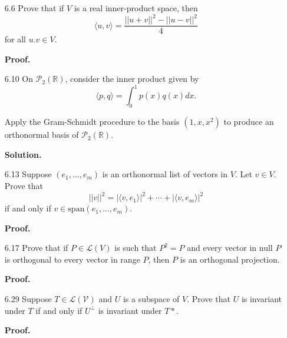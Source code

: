 \documentclass[9pt]{article}
\newcommand{\R}{\mathbb{R}}
\newcommand{\cyc}[1]{\langle #1 \rangle}
\begin{document}
\begin{enumerate}
   \item[6.6]  Prove that if $V$ is a real inner-product space, then
               $$\cyc{u, v} = \frac{||u + v||^2 - ||u - v||^2}{4}$$
               for all $u. v \in V$.

      \textbf{Proof.} 
   \item[6.10] On $\mathcal{P}_2(\R)$, consider the inner product given by
               $$\cyc{p, q} = \int_0^1p(x)q(x) dx.$$

               Apply the Gram-Schmidt procedure to the basis $(1, x, x^2)$ to
               produce an orthonormal basis of $\mathcal{P}_2(\R)$.

      \textbf{Solution.} 
   \item[6.13] Suppose $(e_1, \ldots, e_m)$ is an orthonormal list of vectors in
               $V$. Let $v \in V$. Prove that
               $$||v||^2 = |\cyc{v, e_1}|^2 + \cdots + |\cyc{v, e_m}|^2$$
               if and only if $v \in \text{span}(e_1, \ldots, e_m)$.
               
      \textbf{Proof.} 
   \item[6.17] Prove that if $P \in \mathcal{L}(V)$ is such that $P^2 = P$ and
               every vector in null $P$ is orthogonal to every vector in range
               $P$, then $P$ is an orthogonal projection.
               
      \textbf{Proof.}
   \item[6.29] Suppose $T \in \mathcal{L(V)}$ and $U$ is a subspace of $V$.
               Prove that $U$ is invariant under $T$ if and only if $U^\perp$
               is invariant under $T*$.
               
      \textbf{Proof.}
\end{enumerate}
\end{document}
